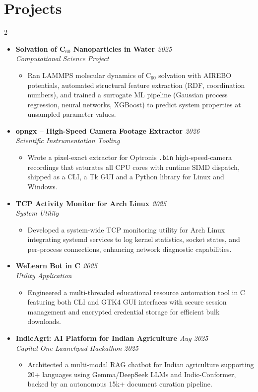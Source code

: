 \documentclass[a4paper,10pt]{article}
\newcommand{\resumeProject}[4]{
    \item\small{
        \textbf{#1} \hfill \textit{#2}\\
        \textit{#3}\\
        \begin{itemize}[leftmargin=1.5em,label=\textbullet,nosep,itemsep=0.5pt]
            #4
        \end{itemize}
    }\vspace{2pt}
}
\newcommand{\compactSection}[2]{
    \section{#1}
    \vspace{-0.1cm}
    #2
    \vspace{-0.2cm}
}
\begin{document}
\compactSection{Projects}{
\setlength{\columnsep}{15pt}
\begin{multicols}{2}
\begin{itemize}[leftmargin=*,label={},itemsep=4pt]

    \resumeProject{Solvation of C$_{60}$ Nanoparticles in Water \href{https://github.com/Shuvam-Banerji-Seal/Solvent-Structure-around-NanoParticles}{\faGithub}}{2025}
    {Computational Science Project}
    {\item Ran LAMMPS molecular dynamics of C$_{60}$ solvation with AIREBO potentials, automated structural feature extraction (RDF, coordination numbers), and trained a surrogate ML pipeline (Gaussian process regression, neural networks, XGBoost) to predict system properties at unsampled parameter values.}

    \resumeProject{opngx -- High-Speed Camera Footage Extractor \href{https://github.com/Shuvam-Banerji-Seal/opngx}{\faGithub}}{2026}
    {Scientific Instrumentation Tooling}
    {\item Wrote a pixel-exact extractor for Optronis \texttt{.bin} high-speed-camera recordings that saturates all CPU cores with runtime SIMD dispatch, shipped as a CLI, a Tk GUI and a Python library for Linux and Windows.}

    \resumeProject{TCP Activity Monitor for Arch Linux \href{https://github.com/Shuvam-Banerji-Seal/TCP-Count-Monitor-for-Arch-Linux}{\faGithub}}{2025}
    {System Utility}
    {\item Developed a system-wide TCP monitoring utility for Arch Linux integrating systemd services to log kernel statistics, socket states, and per-process connections, enhancing network diagnostic capabilities.}

    \resumeProject{WeLearn Bot in C \href{https://github.com/Shuvam-Banerji-Seal/welearnbot_in_C}{\faGithub}}{2025}
    {Utility Application}
    {\item Engineered a multi-threaded educational resource automation tool in C featuring both CLI and GTK4 GUI interfaces with secure session management and encrypted credential storage for efficient bulk downloads.}

    \resumeProject{IndicAgri: AI Platform for Indian Agriculture \href{https://github.com/Shuvam-Banerji-Seal/Answering_Agriculture}{\faGithub}}{Aug 2025}
    {Capital One Launchpad Hackathon 2025}
    {\item Architected a multi-modal RAG chatbot for Indian agriculture supporting 20+ languages using Gemma/DeepSeek LLMs and Indic-Conformer, backed by an autonomous 15k+ document curation pipeline.}
    

\end{itemize}
\end{multicols}}
\end{document}
